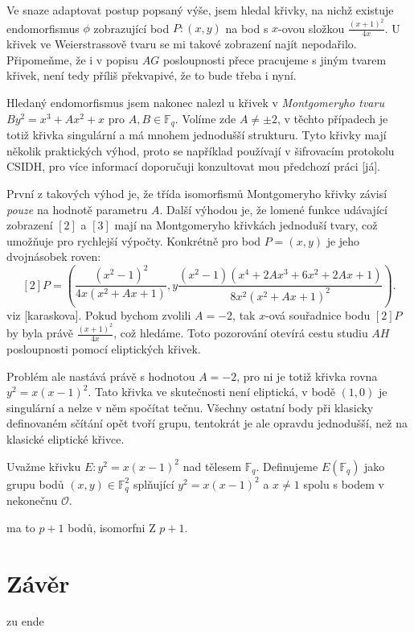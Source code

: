 \documentclass[12pt]{report}
\begin{document}
Ve snaze adaptovat postup popsaný výše, jsem hledal křivky, na nichž existuje endomorfismus $\phi$ zobrazující bod $P : (x,y)$ na bod s $x$-ovou složkou $\frac{(x+1)^2}{4x}$. U křivek ve Weierstrassově tvaru se mi takové zobrazení najít nepodařilo. Připomeňme, že i v popisu $AG$ posloupnosti přece pracujeme s jiným tvarem křivek, není tedy příliš překvapivé, že to bude třeba i nyní.

Hledaný endomorfismus jsem nakonec nalezl u křivek v \textit{Montgomeryho tvaru} $ B y^2 = x^3 + A x^2 +x$ pro $A,B \in \mathbb{F}_q$. Volíme zde $A \neq \pm 2$, v těchto případech je totiž křivka singulární a má mnohem jednodušší strukturu. Tyto křivky mají několik praktických výhod, proto se například používají v šifrovacím protokolu CSIDH, pro více informací doporučuji konzultovat mou předchozí práci [já].

První z takových výhod je, že třída isomorfismů Montgomeryho křivky závisí \textit{pouze} na hodnotě parametru $A$. Další výhodou je, že lomené funkce udávající zobrazení $[2]$ a $[3]$ mají na Montgomeryho křivkách jednoduší tvary, což umožňuje pro rychlejší výpočty. Konkrétně pro bod $P = (x,y)$ je jeho dvojnásobek roven:
$$[2] P = \left(\frac{(x^2-1)^2}{4x(x^2+Ax+1)},y \frac{(x^2-1)(x^4+2 A x^3 + 6x^2 + 2 Ax + 1)}{8 x^2 (x^2+Ax+1)^2} \right).$$
viz [karaskova]. Pokud bychom zvolili $A = -2$, tak $x$-ová souřadnice bodu $[2]P$ by byla právě $\frac{(x+1)^2}{4x}$, což hledáme. Toto pozorování otevírá cestu studiu $AH$ posloupnosti pomocí eliptických křivek.

Problém ale nastává právě s hodnotou $A=-2$, pro ni je totiž křivka rovna $y^2 = x(x-1)^2$. Tato křivka ve skutečnosti není eliptická, v bodě $(1,0)$ je singulární a nelze v něm spočítat tečnu. Všechny ostatní body při klasicky definovaném sčítání opět tvoří grupu, tentokrát je ale opravdu jednodušší, než na klasické eliptické křivce.

\begin{definice}
Uvažme křivku $E : y^2 = x(x-1)^2$ nad tělesem $\mathbb{F}_q$. Definujeme $E(\mathbb{F}_q)$ jako grupu bodů $(x,y) \in \mathbb{F}_q ^2$ splňující $y^2 = x(x-1)^2$ a $x \neq 1$ spolu s bodem v nekonečnu $\mathcal{O}$. 
\end{definice}



ma to $p+1$ bodů, isomorfni Z $p+1$. 





\chapter*{Závěr}
zu ende
\end{document}
